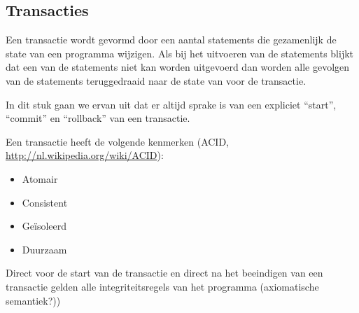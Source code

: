\subsection{Transacties}
Een transactie wordt gevormd door een aantal statements die gezamenlijk de state van een programma wijzigen. Als bij het
uitvoeren van de statements blijkt dat een van de statements niet kan worden uitgevoerd dan worden alle gevolgen van de
statements teruggedraaid naar de state van voor de transactie.

In dit stuk gaan we ervan uit dat er altijd sprake is van een expliciet ``start'', ``commit'' en ``rollback'' van een
transactie.

Een transactie heeft de volgende kenmerken (ACID, \url{http://nl.wikipedia.org/wiki/ACID}):
\begin{itemize}
\item Atomair
\item Consistent
\item Ge\"isoleerd
\item Duurzaam
\end{itemize}

Direct voor de start van de transactie en direct na het beeindigen van een transactie gelden alle integriteitsregels van
het programma (axiomatische semantiek?))

